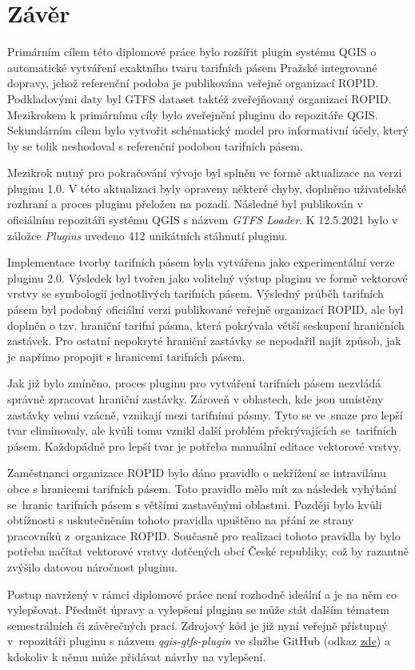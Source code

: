 \chapter*{Závěr}
\label{6-zaver}

Primárním cílem této diplomové práce bylo rozšířit plugin systému QGIS 
o automa\-tické vytváření exaktního tvaru tarifních pásem Pražské integrované dopravy, 
jehož referenční podoba je publikována veřejně organizací ROPID.  
Podkladovými daty byl GTFS dataset taktéž zveřejňovaný organizací ROPID.
Mezikrokem k primárnímu cíly bylo zveřejnění pluginu do repozitáře QGIS. Sekundárním cílem bylo vytvořit schématický model pro 
informativní účely, který by se tolik neshodoval s referenční podobou tarifních pásem.

Mezikrok nutný pro pokračování vývoje byl splněn ve formě aktualizace na verzi pluginu 1.0.
V této aktualizaci byly opraveny některé chyby, doplněno uživatelské rozhraní a proces pluginu přeložen na pozadí. 
Následné byl publikován v oficiálním repozitáři systému QGIS s názvem \textit{GTFS Loader}. 
K 12.5.2021 bylo v záložce \textit{Plugins} uvedeno 412 unikátních stáhnutí pluginu.

Implementace tvorby tarifních pásem byla vytvářena jako experimentální verze pluginu 2.0. Výsledek
byl tvořen jako volitelný výstup pluginu ve formě vektorové vrstvy se symbologií jednotlivých tarifních pásem.
Výsledný průběh tarifních pásem byl podobný oficiální verzi publikované veřejně organizací ROPID, ale byl doplněn o tzv. hraniční tarifní pásma,
která pokrývala větší seskupení hraničních zastávek. Pro ostatní nepokryté hraniční zastávky 
se nepodařil najít způsob, jak je napřímo propojit s hranicemi tarifních pásem.

Jak již bylo zmíněno, proces pluginu pro vytváření tarifních pásem nezvládá správně zpracovat hraniční zastávky.
Zároveň v oblastech, kde jsou umístěny zastávky velmi vzácně, vznikají  mezi tarifními pásmy.
Tyto  se ve~snaze pro lepší tvar eliminovaly, ale kvůli tomu vznikl další problém překrývajících se~ta\-rifních pásem.
Každopádně pro lepší tvar je potřeba manuální editace vektorové vrstvy.

Zaměstnanci organizace ROPID bylo dáno pravidlo o nekřížení se intravilánu obce s hranicemi tarifních pásem.
Toto pravidlo mělo mít za následek vyhýbání se~hranic tarifních pásem s většími zastavěnými oblastmi.
Později bylo kvůli obtíž\-nosti s uskutečněním tohoto pravidla upuštěno na přání ze strany pracovníků z~organizace ROPID.
Současně pro realizaci tohoto pravidla by bylo potřeba načítat vektorové vrstvy
dotčených obcí České republiky, což by razantně zvýšilo datovou náročnost pluginu.

Postup navržený v rámci diplomové práce není rozhodně ideální a je na něm co vylepšovat. Předmět úpravy a vylepšení pluginu
se může stát dalším tématem semestrálních či závěrečných prací. Zdrojový kód
je již nyní veřejně přístupný v~repozitáři pluginu s názvem \textit{qgis-gtfs-plugin} ve službe GitHub (odkaz \href{https://github.com/ctu-geoforall-lab/qgis-gtfs-plugin/tree/pid\_zones}
{\underline{zde}}) a kdokoliv k němu může přidávat
návrhy na vylepšení.  

